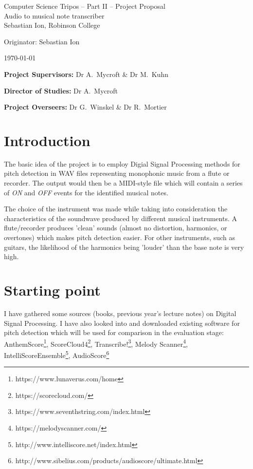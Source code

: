 \documentclass[12pt,a4paper,twoside]{article}
\begin{document}
\begin{center}
\Large
Computer Science Tripos -- Part II -- Project Proposal\\[4mm]
\LARGE
Audio to musical note transcriber\\[4mm]

\large
Sebastian Ion, Robinson College

Originator: Sebastian Ion

\today
\end{center}

\vspace{5mm}

\textbf{Project Supervisors:} Dr A.~Mycroft \& Dr M.~Kuhn

\textbf{Director of Studies:} Dr A.~Mycroft

\textbf{Project Overseers:} Dr G.~Winskel \& Dr R.~Mortier


\section*{Introduction}

The basic idea of the project is to employ Digial Signal Processing methods for pitch detection in WAV files representing monophonic music from a flute or recorder.
The output would then be a MIDI-style file which will contain a series of \emph{ON} and \emph{OFF} events for the identified musical notes.
\par
The choice of the instrument was made while taking into consideration the characteristics of the soundwave produced by different musical instruments. A flute/recorder produces 'clean' sounds (almost no distortion, harmonics, or overtones) which makes pitch detection easier.
For other instruments, such as guitars, the likelihood of the harmonics being 'louder' than the base note is very high.

\section*{Starting point}
I have gathered some sources (books, previous year's lecture notes) on Digital Signal Processing.
I have also looked into and downloaded existing software for pitch detection which will be used for comparison in the evaluation stage:
AnthemScore\footnote{https://www.lunaverus.com/home},
ScoreCloud4\footnote{https://scorecloud.com/},
Transcribe!\footnote{https://www.seventhstring.com/index.html},
Melody Scanner\footnote{https://melodyscanner.com/},
IntelliScoreEnsemble\footnote{http://www.intelliscore.net/index.html},
AudioScore\footnote{http://www.sibelius.com/products/audioscore/ultimate.html}
\end{document}
